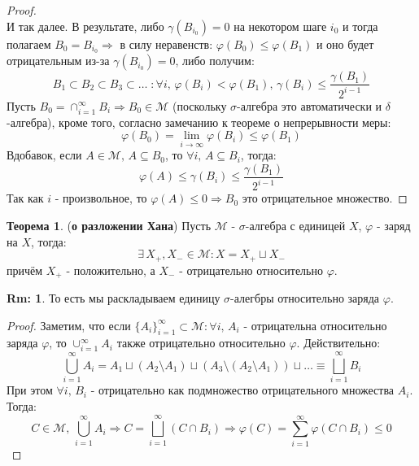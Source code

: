 \documentclass[12pt]{article}
\newcommand{\MM}{\mathcal{M}}
\theoremstyle{definition}
\newtheorem{rem}{Rm:}
\newtheorem{theorem}{Теорема}
\newcommand{\ddsum}[2]{\displaystyle\sum\limits_{#1}^{#2}}
\begin{document}
\begin{proof}
$$	$$
	И так далее. В результате, либо $\gamma(B_{i_0}) = 0$ на некотором шаге $i_0$ и тогда полагаем $B_0 = B_{i_0} \Rightarrow$ в силу неравенств: $\varphi(B_0) \leq \varphi(B_1)$ и оно будет отрицательным из-за $\gamma(B_{i_0}) = 0$, либо получим:
	$$
		B_1 \subset B_2 \subset B_3 \subset \dotsc \; \colon \forall i, \, \varphi(B_i) < \varphi(B_1), \, \gamma(B_i) \leq \dfrac{\gamma(B_1)}{2^{i-1}}
	$$
	Пусть $B_0 = \cap_{i = 1}^{\infty}B_i \Rightarrow B_0 \in \MM$ (поскольку $\sigma$-алгебра это автоматически и $\delta$-алгебра), кроме того, согласно замечанию к теореме о непрерывности меры:
	$$
		\varphi(B_0) = \lim\limits_{i \to \infty}\varphi(B_i) \leq \varphi(B_1)
	$$
	Вдобавок, если $A \in \MM, \, A \subseteq B_0$, то $\forall i, \, A \subseteq B_i$, тогда:
	$$
		\varphi(A) \leq \gamma(B_i) \leq \dfrac{\gamma(B_1)}{2^{i-1}}
	$$
	Так как $i$ - произвольное, то $\varphi(A) \leq 0 \Rightarrow B_0$ это отрицательное множество.
\end{proof}

\begin{theorem}(\textbf{о разложении Хана})
	Пусть $\MM$ - $\sigma$-алгебра с единицей $X$, $\varphi$ - заряд на $X$, тогда: 
	$$
		\exists \, X_+, X_- \in \MM \colon X = X_+ \sqcup X_-
	$$
	причём $X_+$ - положительно, а $X_-$ - отрицательно относительно $\varphi$.
\end{theorem}
\begin{rem}
	То есть мы раскладываем единицу $\sigma$-алегбры относительно заряда $\varphi$.
\end{rem}
\begin{proof}
	Заметим, что если $\{A_i\}_{i = 1}^{\infty} \subset \MM \colon \forall i, \, A_i$ - отрицательна относительно заряда $\varphi$, то $\cup_{i = 1}^{\infty}A_i$ также отрицательно относительно $\varphi$. Действительно:
	$$
		\bigcup\limits_{i = 1}^{\infty}A_i = A_1 \sqcup \left(A_2 \setminus A_1 \right) \sqcup \left(A_3 \setminus \left(A_2 \setminus A_1 \right) \right) \sqcup \dotsc \equiv \bigsqcup\limits_{i = 1}^{\infty}B_i
	$$
	При этом $\forall i, \, B_i$ - отрицательно как подмножество отрицательного множества $A_i$. Тогда: 
	$$
		C \in \MM, \, \bigcup\limits_{i = 1}^{\infty}A_i \Rightarrow C = \bigsqcup\limits_{i = 1}^{\infty}(C \cap B_i) \Rightarrow \varphi(C) = \ddsum{i = 1}{\infty}\varphi(C \cap B_i) \leq 0
	$$
\end{proof}
	
\end{document}
